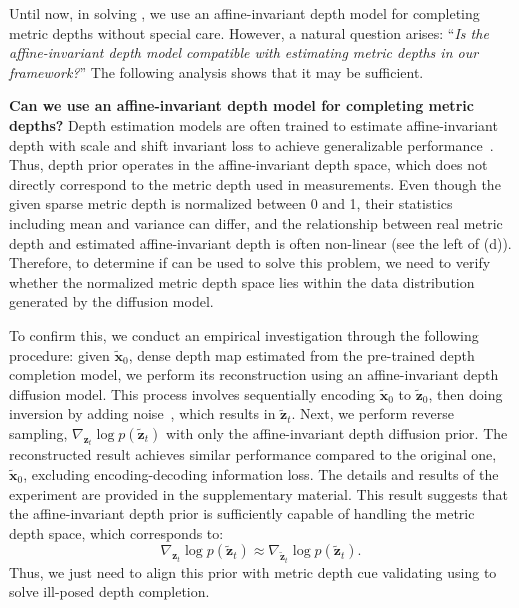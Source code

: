 Until now, in solving , we use an affine-invariant depth model for completing metric depths without special care. However, a natural question arises: ``\textit{Is the affine-invariant depth model compatible with estimating metric depths in our framework?}'' The following analysis shows that it may be sufficient.

\vspace{1mm}\noindent\textbf{Can we use an affine-invariant depth model for completing metric depths?}
Depth estimation models are often trained to estimate affine-invariant depth with scale and shift invariant loss to achieve generalizable performance~\cite{Ranftl2022midas, ke2023repurposing, eigen2014invariant}.
Thus, depth prior operates in the affine-invariant depth space, which does not directly correspond to the metric depth used in measurements.
Even though the given sparse metric depth is normalized between 0 and 1, 
their statistics including 
mean and variance
can differ, and the relationship between real metric depth and estimated affine-invariant depth is often 
non-linear (see 
the left of  (d)).
Therefore, to determine if 
 can be used to solve this problem, we need to verify whether the normalized metric depth space lies within the data distribution generated by the diffusion model.

To confirm this, we conduct an empirical investigation through the following procedure: given $\tilde{\mathbf{x}}_0$, dense depth map estimated from the pre-trained depth completion model, we perform its reconstruction using an affine-invariant depth diffusion model.
This process involves sequentially encoding $\tilde{\mathbf{x}}_0$ to $\tilde{\mathbf{z}}_0$, 
then doing inversion by adding noise~\cite{song2022denoising}, which results in $\tilde{\mathbf{z}}_t$. 
Next, we perform reverse sampling, $\nabla_{\mathbf{z}_t}\log p(\tilde{\mathbf{z}}_t)$ with only the affine-invariant depth diffusion prior.
The reconstructed result achieves similar performance compared to the original one, $\tilde{\mathbf{x}}_0$, excluding encoding-decoding information loss. 
The details and results of the experiment are provided in the supplementary material.
This result suggests that the affine-invariant depth prior is sufficiently capable of handling the metric depth space, 
which corresponds to:
\begin{equation}
\label{eq:verify}
    \nabla_{\mathbf{z}_t}\log p(\tilde{\mathbf{z}}_t) \approx \nabla_{\tilde{\mathbf{z}}_t}\log p(\tilde{\mathbf{z}}_t).
\end{equation}
Thus, we just need to align this prior with metric depth cue validating using  to solve ill-posed depth completion.

